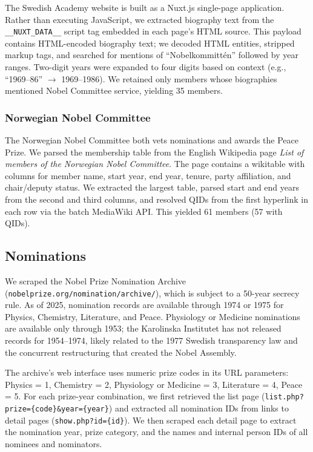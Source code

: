 The Swedish Academy website is built as a Nuxt.js single-page application.
Rather than executing JavaScript, we extracted biography text from the
\texttt{\_\_NUXT\_DATA\_\_} script tag embedded in each page's HTML source.
This payload contains HTML-encoded biography text; we decoded HTML entities,
stripped markup tags, and searched for mentions of ``Nobelkommitt\'en''
followed by year ranges. Two-digit years were expanded to four digits
based on context (e.g., ``1969--86'' $\to$ 1969--1986). We retained only
members whose biographies mentioned Nobel Committee service, yielding 35
members.

\subsubsection{Norwegian Nobel Committee}

The Norwegian Nobel Committee both vets nominations and awards the Peace
Prize. We parsed the membership table from the English Wikipedia page
\emph{List of members of the Norwegian Nobel Committee}. The page contains
a wikitable with columns for member name, start year, end year, tenure,
party affiliation, and chair/deputy status. We extracted the largest table,
parsed start and end years from the second and third columns, and resolved
QIDs from the first hyperlink in each row via the batch MediaWiki API.
This yielded 61 members (57 with QIDs).

\subsection{Nominations}\label{sec:nominations}

We scraped the Nobel Prize Nomination Archive
(\texttt{nobelprize.org/nomination/archive/}), which is subject to a 50-year
secrecy rule. As of 2025, nomination records are available through 1974 or
1975 for Physics, Chemistry, Literature, and Peace. Physiology or Medicine
nominations are available only through 1953; the Karolinska Institutet has
not released records for 1954--1974, likely related to the 1977 Swedish
transparency law and the concurrent restructuring that created the Nobel
Assembly.

The archive's web interface uses numeric prize codes in its URL parameters:
Physics = 1, Chemistry = 2, Physiology or Medicine = 3, Literature = 4,
Peace = 5. For each prize-year combination, we first retrieved the list page
(\texttt{list.php?prize=\{code\}\&year=\{year\}}) and extracted all
nomination IDs from links to detail pages (\texttt{show.php?id=\{id\}}).
We then scraped each detail page to extract the nomination year, prize
category, and the names and internal person IDs of all nominees and
nominators.

